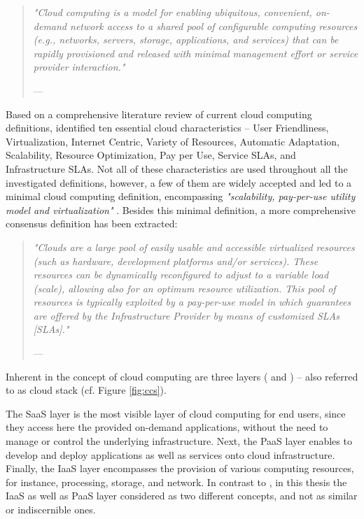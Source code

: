 \begin{quote}{\slshape 
"Cloud computing is a model for enabling ubiquitous, convenient, on-demand network access to a shared pool of configurable computing resources (e.g., networks, servers, storage, applications, and services) that can be rapidly provisioned and released with minimal management effort or service provider interaction."}
\vspace*{-7pt}
\begin{flushright}
	--- \citet[p. 2]{Mell2011}
\end{flushright}
\end{quote}

Based on a comprehensive literature review of current cloud computing definitions, \citet{Vaquero2009} identified ten essential cloud characteristics -- User Friendliness, Virtualization, Internet Centric, Variety of Resources, Automatic Adaptation, Scalability, Resource Optimization, Pay per Use, Service SLAs, and Infrastructure SLAs. Not all of these characteristics are used throughout all the investigated definitions, however, a few of them are widely accepted and led to a minimal cloud computing definition, encompassing \textit{"scalability, pay-per-use utility model and virtualization"} \citep[p. 51]{Vaquero2009}. Besides this minimal definition, a more comprehensive consensus definition has been extracted:

\begin{quote}{\slshape 
"Clouds are a large pool of easily usable and accessible virtualized resources (such as hardware, development platforms and/or services). These resources can be dynamically reconfigured to adjust to a variable load (scale), allowing also for an optimum resource utilization. This
pool of resources is typically exploited by a pay-per-use model in which guarantees are offered by the Infrastructure Provider by means of customized \acs{SLA}s [\acl{SLA}s]."}
\vspace*{-7pt}
\begin{flushright}
	--- \citet[p. 51]{Vaquero2009}
\end{flushright}
\end{quote}

Inherent in the concept of cloud computing are three layers (\citealp[pp. 118-119]{Iyer2010} and \citealp[pp. 2-3]{Mell2011}) -- also referred to as cloud stack (cf. Figure \ref{fig:ccs}). 

The \ac{SaaS} layer is the most visible layer of cloud computing for end users, since they access here the provided on-demand applications, without the need to manage or control the underlying infrastructure. Next, the \ac{PaaS} layer enables to develop and deploy applications as well as services onto cloud infrastructure. Finally, the \ac{IaaS} layer encompasses the provision of various computing resources, for instance, processing, storage, and network. In contrast to \citet[p.50]{Armbrust2010}, in this thesis the \ac{IaaS} as well as \ac{PaaS} layer considered as two different concepts, and not as similar or indiscernible ones. 

